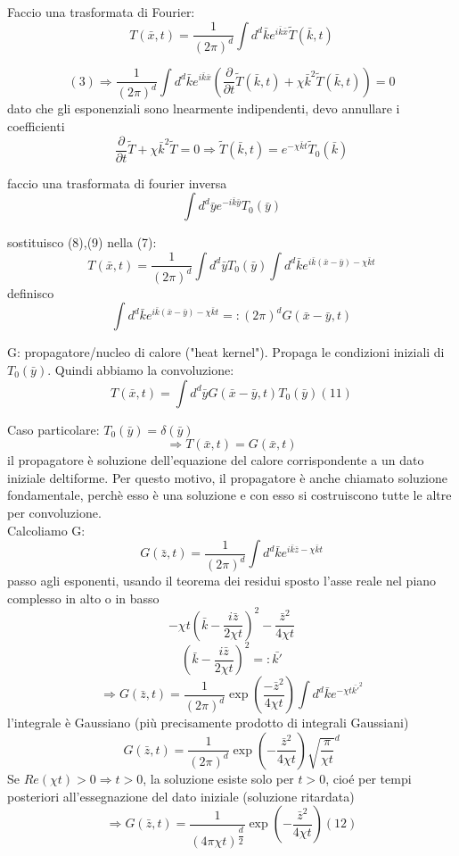 \documentclass[a4paper,11pt]{report}
\begin{document}
Faccio una trasformata di Fourier:
\begin{equation}
T(\bar{x},t)=\dfrac{1}{(2\pi)^d}\int d^d\bar{k}e^{i\bar{k}\bar{x}}\tilde{T}(\bar{k},t) 
\end{equation}

$$(3)\Rightarrow\dfrac{1}{(2\pi)^d}\int d^d \bar{k} e^{i\bar{k}\bar{x}}\left(\dfrac{\partial}{\partial t}\tilde{T}(\bar{k},t) + \chi \bar{k}^2\tilde{T}(\bar{k},t)\right)=0 
$$
dato che gli esponenziali sono lnearmente indipendenti, devo annullare i coefficienti
\begin{equation}
\dfrac{\partial}{\partial t}\tilde{T}+\chi \bar{k}^2\tilde{T}=0 \Rightarrow\tilde{T}(\bar{k},t)=e^{-\chi\bar{k}t }\tilde{T}_0(\bar{k}) 
\end{equation}

faccio una trasformata di fourier inversa
\begin{equation}
\int d^d \bar{y}e^{-i\bar{k}\bar{y}}T_0(\bar{y}) 
\end{equation}

sostituisco (8),(9) nella (7):
$$
T(\bar{x},t)=\dfrac{1}{(2\pi)^d}\int d^d \bar{y}T_0(\bar{y})\int d^d\bar{k}e^{i\bar{k}(\bar{x}-\bar{y})-\chi\bar{k}t}
$$
definisco
\begin{equation}
\int d^d\bar{k}e^{i\bar{k}(\bar{x}-\bar{y})-\chi\bar{k}t }=:(2\pi)^d G(\bar{x}-\bar{y},t)
\end{equation}

G: propagatore/nucleo di calore ("heat kernel"). Propaga le condizioni iniziali di $T_0(\bar{y})$. Quindi abbiamo la convoluzione:
\begin{equation}
T(\bar{x},t)=\int d^d\bar{y}G(\bar{x}-\bar{y},t)T_0(\bar{y}) (11)
\end{equation}

Caso particolare: $T_0(\bar{y})=\delta(\bar{y})$
$$
\Rightarrow T(\bar{x},t)=G(\bar{x},t)
$$
il propagatore è soluzione dell'equazione del calore corrispondente a un dato iniziale deltiforme. Per questo motivo, il propagatore è anche chiamato soluzione fondamentale, perchè esso è una soluzione e con esso si costruiscono tutte le altre per convoluzione.\\
Calcoliamo G:
$$
G(\bar{z},t)=\dfrac{1}{(2\pi)^d}\int d^d \bar{k}e^{i\bar{k}\bar{z}-\chi \bar{k}t}
$$
passo agli esponenti, usando il teorema dei residui sposto l'asse reale nel piano complesso in alto o in basso
$$
-\chi t\left(\bar{k}-\dfrac{i\bar{z}}{2\chi t}\right)^2-\dfrac{\bar{z}^2}{4\chi t}
$$
$$
\left(\bar{k}-\dfrac{i\bar{z}}{2\chi t}\right)^2=:\bar{k'}
$$
$$
\Rightarrow G(\bar{z},t)=\dfrac{1}{(2\pi)^d}\exp\left(\dfrac{-\bar{z}^2}{4\chi t}\right)\int d^d \bar{k} e^{-\chi t \bar{k'}^2}
$$
l'integrale è Gaussiano (più precisamente prodotto di integrali Gaussiani)
$$
G(\bar{z},t)=\dfrac{1}{(2\pi)^d}\exp\left(-\dfrac{\bar{z}^2}{4\chi t}\right)\sqrt{\dfrac{\pi}{\chi t}}^d
$$
Se $Re(\chi t)>0\Rightarrow t>0$, la soluzione esiste solo per $t>0$, cioé per tempi posteriori all'essegnazione del dato iniziale (soluzione ritardata)
\begin{equation}
\Rightarrow G(\bar{z},t)=\dfrac{1}{(4\pi\chi t)^{\dfrac{d}{2}}}\exp\left(-\dfrac{\bar{z}^2}{4\chi t}\right) (12)
\end{equation}
\end{document}
